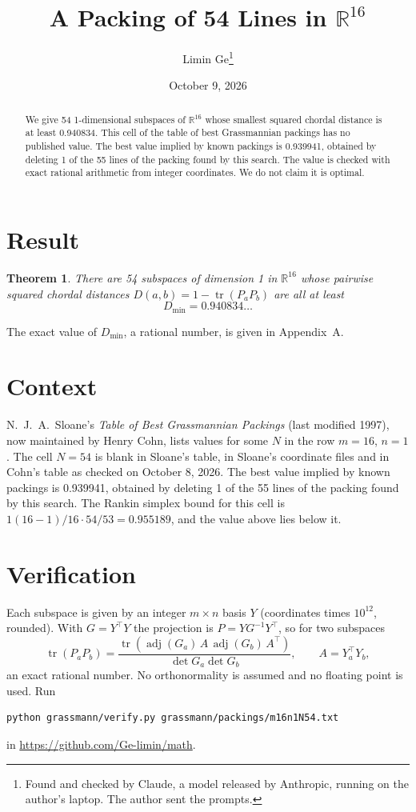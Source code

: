 \documentclass[11pt,a4paper]{article}
\title{A Packing of 54 Lines in $\mathbb{R}^{16}$}
\author{Limin Ge\thanks{Found and checked by Claude, a model released by Anthropic, running on the author's laptop. The author sent the prompts.}}
\date{October 9, 2026}
\newtheorem*{theorem}{Theorem}
\begin{document}
\maketitle
\begin{abstract}
We give 54 1-dimensional subspaces of $\mathbb{R}^{16}$ whose smallest squared chordal distance is at least 0.940834. This cell of the table of best Grassmannian packings has no published value. The best value implied by known packings is 0.939941, obtained by deleting 1 of the 55 lines of the packing found by this search. The value is checked with exact rational arithmetic from integer coordinates. We do not claim it is optimal.
\end{abstract}

\section{Result}
\begin{theorem}
There are 54 subspaces of dimension 1 in $\mathbb{R}^{16}$ whose pairwise squared chordal distances $D(a,b) = 1 - \operatorname{tr}(P_aP_b)$ are all at least
\[ D_{\min} = 0.940834\ldots \]
\end{theorem}
The exact value of $D_{\min}$, a rational number, is given in Appendix~A.


\section{Context}
N.~J.~A.~Sloane's \emph{Table of Best Grassmannian Packings} (last modified 1997), now maintained by Henry Cohn, lists values for some $N$ in the row $m=16$, $n=1$. The cell $N=54$ is blank in Sloane's table, in Sloane's coordinate files and in Cohn's table as checked on October 8, 2026. The best value implied by known packings is 0.939941, obtained by deleting 1 of the 55 lines of the packing found by this search. The Rankin simplex bound for this cell is $1(16-1)/16\cdot 54/53 = 0.955189$, and the value above lies below it.


\section{Verification}
Each subspace is given by an integer $m\times n$ basis $Y$ (coordinates times $10^{12}$, rounded). With $G=Y^\top Y$ the projection is $P=YG^{-1}Y^\top$, so for two subspaces
\[ \operatorname{tr}(P_aP_b)=\frac{\operatorname{tr}(\operatorname{adj}(G_a)\,A\,\operatorname{adj}(G_b)\,A^\top)}{\det G_a\det G_b},\qquad A=Y_a^\top Y_b, \]
an exact rational number. No orthonormality is assumed and no floating point is used. Run
\begin{verbatim}
python grassmann/verify.py grassmann/packings/m16n1N54.txt
\end{verbatim}
in \url{https://github.com/Ge-limin/math}.
\end{document}
